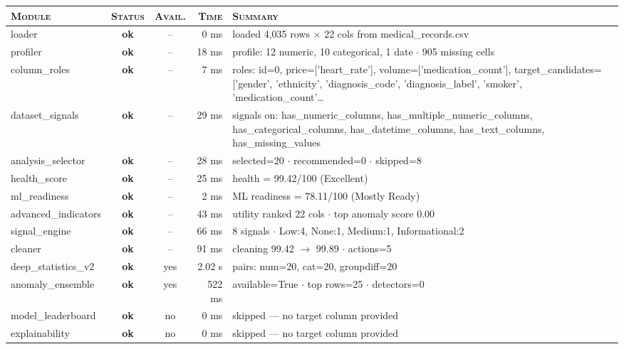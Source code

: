 \documentclass[11pt,a4paper]{article}
\begin{document}
\begin{tabularx}{\linewidth}{l c c r X}
\toprule
\textsc{Module} & \textsc{Status} & \textsc{Avail.} & \textsc{Time} & \textsc{Summary} \\
\midrule
  loader & \textcolor{ok}{\textbf{ok}} & -- & 0 ms & loaded 4,035 rows $\times$ 22 cols from medical\_records.csv \\
  profiler & \textcolor{ok}{\textbf{ok}} & -- & 18 ms & profile: 12 numeric, 10 categorical, 1 date $\cdot$ 905 missing cells \\
  column\_roles & \textcolor{ok}{\textbf{ok}} & -- & 7 ms & roles: id=0, price=['heart\_rate'], volume=['medication\_count'], target\_candidates=['gender', 'ethnicity', 'diagnosis\_code', 'diagnosis\_label', 'smoker', 'medication\_count'\ldots{} \\
  dataset\_signals & \textcolor{ok}{\textbf{ok}} & -- & 29 ms & signals on: has\_numeric\_columns, has\_multiple\_numeric\_columns, has\_categorical\_columns, has\_datetime\_columns, has\_text\_columns, has\_missing\_values \\
  analysis\_selector & \textcolor{ok}{\textbf{ok}} & -- & 28 ms & selected=20 $\cdot$ recommended=0 $\cdot$ skipped=8 \\
  health\_score & \textcolor{ok}{\textbf{ok}} & -- & 25 ms & health = 99.42/100 (Excellent) \\
  ml\_readiness & \textcolor{ok}{\textbf{ok}} & -- & 2 ms & ML readiness = 78.11/100 (Mostly Ready) \\
  advanced\_indicators & \textcolor{ok}{\textbf{ok}} & -- & 43 ms & utility ranked 22 cols $\cdot$ top anomaly score 0.00 \\
  signal\_engine & \textcolor{ok}{\textbf{ok}} & -- & 66 ms & 8 signals $\cdot$ Low:4, None:1, Medium:1, Informational:2 \\
  cleaner & \textcolor{ok}{\textbf{ok}} & -- & 91 ms & cleaning 99.42 $\rightarrow$ 99.89 $\cdot$ actions=5 \\
  deep\_statistics\_v2 & \textcolor{ok}{\textbf{ok}} & \textcolor{ok}{yes} & 2.02 s & pairs: num=20, cat=20, groupdiff=20 \\
  anomaly\_ensemble & \textcolor{ok}{\textbf{ok}} & \textcolor{ok}{yes} & 522 ms & available=True $\cdot$ top rows=25 $\cdot$ detectors=0 \\
  model\_leaderboard & \textcolor{ok}{\textbf{ok}} & \textcolor{ink3}{no} & 0 ms & skipped --- no target column provided \\
  explainability & \textcolor{ok}{\textbf{ok}} & \textcolor{ink3}{no} & 0 ms & skipped --- no target column provided \\

\end{tabularx}
\end{document}
